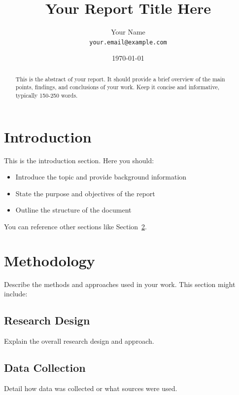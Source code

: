 \documentclass[12pt, a4paper]{article}
\title{Your Report Title Here}
\author{Your Name\\
        \texttt{your.email@example.com}}
\date{\today}
\begin{document}
\maketitle
\thispagestyle{empty}

\begin{abstract}
    This is the abstract of your report. It should provide a brief overview of the main points, 
    findings, and conclusions of your work. Keep it concise and informative, typically 
    150-250 words.
\end{abstract}

\newpage

\tableofcontents
\newpage


\section{Introduction}
\label{sec:introduction}

This is the introduction section. Here you should:
\begin{itemize}
    \item Introduce the topic and provide background information
    \item State the purpose and objectives of the report
    \item Outline the structure of the document
\end{itemize}

You can reference other sections like Section~\ref{sec:methodology}.

\section{Methodology}
\label{sec:methodology}

Describe the methods and approaches used in your work. This section might include:

\subsection{Research Design}
Explain the overall research design and approach.

\subsection{Data Collection}
Detail how data was collected or what sources were used.
\end{document}
